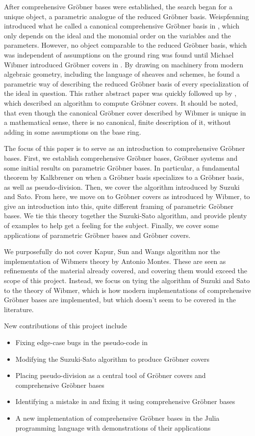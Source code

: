 \documentclass[a4paper, 12pt]{article}
\theoremstyle{changedot}
\theoremstyle{changedotbreak}
\theoremstyle{nonumberplain}
\begin{document}
After comprehensive Gröbner bases were established, the search began for a unique object, a parametric analogue of the reduced Gröbner basis. Weispfenning introduced what he called a canonical comprehensive Gröbner basis in \cite{WEISPFENNING2003669}, which only depends on the ideal and the monomial order on the variables and the parameters. However, no object comparable to the reduced Gröbner basis, which was independent of assumptions on the ground ring was found until Michael Wibmer introduced Gröbner covers in \cite{grb_covers}. By drawing on machinery from modern algebraic geometry, including the language of sheaves and schemes, he found a parametric way of describing the reduced Gröbner basis of every specialization of the ideal in question. This rather abstract paper was quickly followed up by \cite{MONTES20101391}, which described an algorithm to compute Gröbner covers. It should be noted, that even though the canonical Gröbner cover described by Wibmer is unique in a mathematical sense, there is no canonical, finite description of it, without adding in some assumptions on the base ring.

The focus of this paper is to serve as an introduction to comprehensive Gröbner bases. First, we establish comprehensive Gröbner bases, Gröbner systems and some initial results on parametric Gröbner bases. In particular, a fundamental theorem by Kalkbrener\cite{Kalkbrener} on when a Gröbner basis specializes to a Gröbner basis, as well as pseudo-division. Then, we cover the algorithm introduced by Suzuki and Sato. From here, we move on to Gröbner covers as introduced by Wibmer, to give an introduction into this, quite different framing of parametric Gröbner bases. We tie this theory together the Suzuki-Sato algorithm, and provide plenty of examples to help get a feeling for the subject. Finally, we cover some applications of parametric Gröbner bases and Gröbner covers.

We purposefully do not cover Kapur, Sun and Wangs algorithm nor the implementation of Wibmers theory by Antonio Montes\cite{MONTES20101391}. These are seen as refinements of the material already covered, and covering them would exceed the scope of this project. Instead, we focus on tying the algorithm of Suzuki and Sato to the theory of Wibmer, which is how modern implementations of comprehensive Gröbner bases are implemented, but which doesn't seem to be covered in the literature.

New contributions of this project include
\begin{itemize}
  \item Fixing edge-case bugs in the pseudo-code in \cite{ss_algo}
  \item Modifying the Suzuki-Sato algorithm to produce Gröbner covers
  \item Placing pseudo-division as a central tool of Gröbner covers and comprehensive Gröbner bases
  \item Identifying a mistake in \cite{sturmfels} and fixing it using comprehensive Gröbner bases
  \item A new implementation of comprehensive Gröbner bases in the Julia programming language with demonstrations of their applications
\end{itemize}
\end{document}
